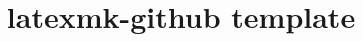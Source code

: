 \documentclass{jsarticle}
\begin{document}
\title{latexmk-github template}
\maketitle



\end{document}
